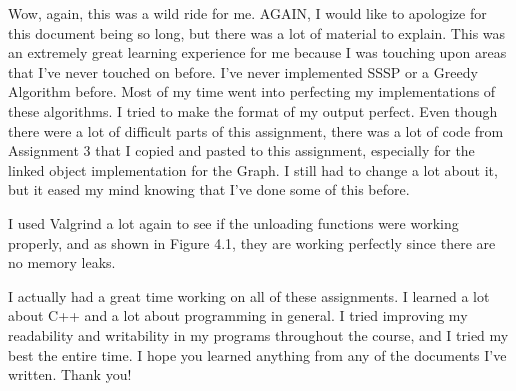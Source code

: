 \documentclass[letterpaper, 10pt]{article}
\begin{document}
\noindent
Wow, again, this was a wild ride for me. AGAIN, I would like to apologize for this document being so long, but there was a lot of material to explain. This was an extremely great learning experience for me because I was touching upon areas that I've never touched on before. I've never implemented SSSP or a Greedy Algorithm before. Most of my time went into perfecting my implementations of these algorithms. I tried to make the format of my output perfect. Even though there were a lot of difficult parts of this assignment, there was a lot of code from Assignment 3 that I copied and pasted to this assignment, especially for the linked object implementation for the Graph. I still had to change a lot about it, but it eased my mind knowing that I've done some of this before. 

\vspace{1em}
\noindent
I used Valgrind a lot again to see if the unloading functions were working properly, and as shown in Figure 4.1, they are working perfectly since there are no memory leaks.

\vspace{1em}
\noindent
I actually had a great time working on all of these assignments. I learned a lot about C++ and a lot about programming in general. I tried improving my readability and writability in my programs throughout the course, and I tried my best the entire time. I hope you learned anything from any of the documents I've written. Thank you!
\end{document}
